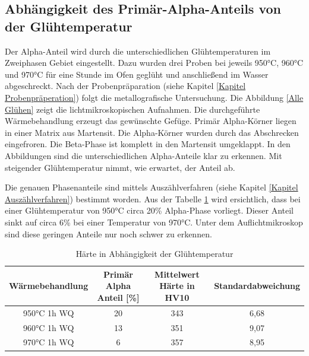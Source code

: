 \documentclass[a4paper, 11pt]{tubsreprt}
\begin{document}
\newpage
\subsection{Abhängigkeit des Primär-Alpha-Anteils von der Glühtemperatur}
Der Alpha-Anteil wird durch die unterschiedlichen Glühtemperaturen im Zweiphasen Gebiet eingestellt. Dazu wurden drei Proben bei jeweils 950°C, 960°C und 970°C für eine Stunde im Ofen geglüht und anschließend im Wasser abgeschreckt. Nach der Probenpräparation (siehe Kapitel \ref{Kapitel Probenpräperation}) folgt die metallografische Untersuchung. Die Abbildung \ref{Alle Glühen} zeigt die lichtmikroskopischen Aufnahmen. Die durchgeführte Wärmebehandlung erzeugt das gewünschte Gefüge. Primär Alpha-Körner liegen in einer Matrix aus Martensit. Die Alpha-Körner wurden durch das Abschrecken eingefroren. Die Beta-Phase ist komplett in den Martensit umgeklappt. In den Abbildungen sind die unterschiedlichen Alpha-Anteile klar zu erkennen. Mit steigender Glühtemperatur nimmt, wie erwartet, der Anteil ab. 

Die genauen Phasenanteile sind mittels Auszählverfahren (siehe Kapitel \ref{Kapitel Auszählverfahren}) bestimmt worden. Aus der Tabelle \ref{Härte in Abhängigkeit der Glühtemperatur} wird ersichtlich, dass bei einer Glühtemperatur von 950°C circa 20\% Alpha-Phase vorliegt. Dieser Anteil sinkt auf circa 6\% bei einer Temperatur von 970°C. Unter dem Auflichtmikroskop sind diese geringen Anteile nur noch schwer zu erkennen.  
\begin{table}[h]	%
\begin{tabular}{c|c|c|c}
Wärmebehandlung	& Primär Alpha Anteil [\%] &	Mittelwert 
Härte in HV10 	& Standardabweichung \\
\hline
950°C 1h WQ	& 	20	&	343	&	6,68 \\
960°C 1h WQ	&	13	&	351	&	9,07 \\
970°C 1h WQ	&	6	&	357	&	8,95 \\

\end{tabular}
\caption{Härte in Abhängigkeit der Glühtemperatur}
\label{Härte in Abhängigkeit der Glühtemperatur}
\end{table}
\end{document}

